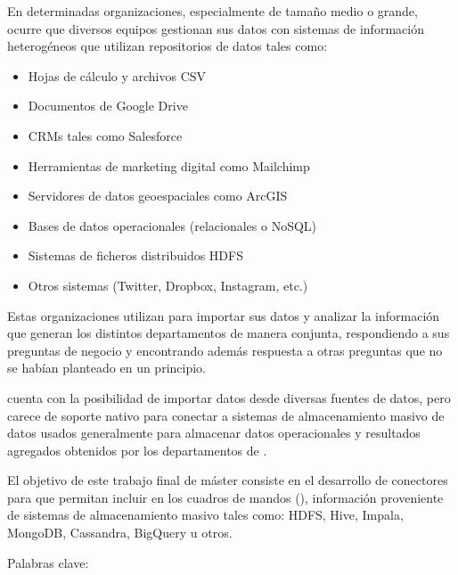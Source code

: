 \documentclass[letterpaper,10pt,spanish]{sphinxmanual}
\begin{document}
En determinadas organizaciones, especialmente de tamaño medio o grande, ocurre que diversos equipos gestionan sus datos con sistemas de información heterogéneos que utilizan repositorios de datos tales como:
\begin{itemize}
\item {} 
Hojas de cálculo y archivos CSV

\item {} 
Documentos de Google Drive

\item {} 
CRMs tales como Salesforce

\item {} 
Herramientas de marketing digital como Mailchimp

\item {} 
Servidores de datos geoespaciales como ArcGIS

\item {} 
Bases de datos operacionales (relacionales o NoSQL)

\item {} 
Sistemas de ficheros distribuidos HDFS

\item {} 
Otros sistemas (Twitter, Dropbox, Instagram, etc.)

\end{itemize}

Estas organizaciones utilizan  para importar sus datos y analizar la información que generan los distintos departamentos de manera conjunta, respondiendo a sus preguntas de negocio y encontrando además respuesta a otras preguntas que no se habían planteado en un principio.

 cuenta con la posibilidad de importar datos desde diversas fuentes de datos, pero carece de soporte nativo para conectar a sistemas de almacenamiento masivo de datos usados generalmente para almacenar datos operacionales y resultados agregados obtenidos por los departamentos de .

El objetivo de este trabajo final de máster consiste en el desarrollo de conectores para  que permitan incluir en los cuadros de mandos (), información proveniente de sistemas de almacenamiento masivo tales como: HDFS, Hive, Impala, MongoDB, Cassandra, BigQuery u otros.

Palabras clave: 
\end{document}
